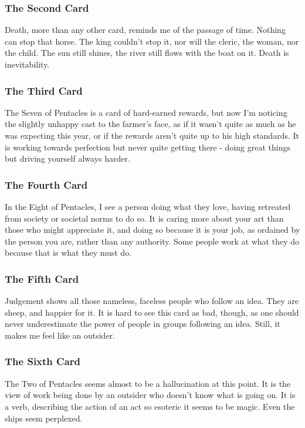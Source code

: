 \subsubsection*{The Second Card}
Death, more than any other card, reminds me of the passage of time.
Nothing can stop that horse.  The king couldn't stop it, nor will the
cleric, the woman, nor the child.  The sun still shines, the river still
flows with the boat on it.  Death is inevitability.

\subsubsection*{The Third Card}
The Seven of Pentacles is a card of hard-earned rewards, but now I'm
noticing the slightly unhappy cast to the farmer's face, as if it wasn't
quite as much as he was expecting this year, or if the rewards aren't
quite up to his high standards.  It is working towards perfection but
never quite getting there - doing great things but driving yourself
always harder.

\subsubsection*{The Fourth Card}
In the Eight of Pentacles, I see a person doing what they love, having
retreated from society or societal norms to do so.  It is caring more
about your art than those who might appreciate it, and doing so because
it is your job, as ordained by the person you are, rather than any
authority.  Some people work at what they do because that is what they
must do.

\subsubsection*{The Fifth Card}
Judgement shows all those nameless, faceless people who follow an idea.
They are sheep, and happier for it.  It is hard to see this card as bad,
though, as one should never underestimate the power of people in groups
following an idea.  Still, it makes me feel like an outsider.

\subsubsection*{The Sixth Card}
The Two of Pentacles seems almost to be a hallucination at this point.
It is the view of work being done by an outsider who doesn't know what
is going on.  It is a verb, describing the action of an act so esoteric
it seems to be magic.  Even the ships seem perplexed.

